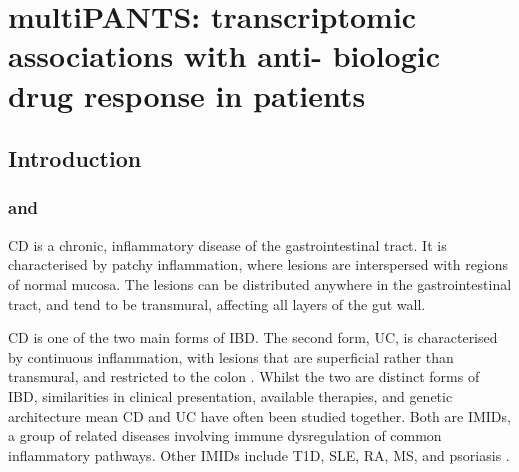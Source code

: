 %
%

\chapter{multiPANTS: transcriptomic associations with anti- biologic drug response in  patients}


\section{Introduction}

\subsection{ and }

\gls{CD} is a chronic, inflammatory disease of the gastrointestinal tract.
It is characterised by patchy inflammation, where lesions are interspersed with regions of normal mucosa. 
The lesions can be distributed anywhere in the gastrointestinal tract, and tend to be transmural, affecting all layers of the gut wall.

\gls{CD} is one of the two main forms of \gls{IBD}.
The second form, \gls{UC}, is characterised by continuous inflammation, with lesions that are superficial rather than transmural, and restricted to the colon \autocite{roda2020CrohnDisease}.
Whilst the two are distinct forms of \gls{IBD}, similarities in clinical presentation, available therapies, and genetic architecture mean \gls{CD} and \gls{UC} have often been studied together.
Both are \glspl{IMID}, a group of related diseases involving immune dysregulation of common inflammatory pathways.
Other \glspl{IMID} include \gls{T1D}, \gls{SLE}, \gls{RA}, \gls{MS}, and psoriasis \autocite{cotsapas2013ImmunemediatedDiseaseGenetics,david2018GeneticsImmunemediatedInflammatory}.

